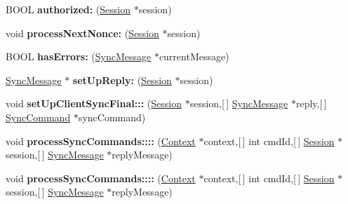 \begin{DoxyCompactItemize}
\item 
\hypertarget{interface_sync_helper_a62a98066f665672a708cd665ad974815}{
\-B\-O\-O\-L {\bfseries authorized\-:} (\hyperlink{interface_session}{\-Session} $\ast$session)}
\label{interface_sync_helper_a62a98066f665672a708cd665ad974815}

\item 
\hypertarget{interface_sync_helper_a077fea806643f0327aea70bb8d94c387}{
void {\bfseries process\-Next\-Nonce\-:} (\hyperlink{interface_session}{\-Session} $\ast$session)}
\label{interface_sync_helper_a077fea806643f0327aea70bb8d94c387}

\item 
\hypertarget{interface_sync_helper_a512e8a3540b1e98b7b90a0064d034ee8}{
\-B\-O\-O\-L {\bfseries has\-Errors\-:} (\hyperlink{interface_sync_message}{\-Sync\-Message} $\ast$current\-Message)}
\label{interface_sync_helper_a512e8a3540b1e98b7b90a0064d034ee8}

\item 
\hypertarget{interface_sync_helper_a21a293ea4849bd1eadd24d45d63a8d99}{
\hyperlink{interface_sync_message}{\-Sync\-Message} $\ast$ {\bfseries set\-Up\-Reply\-:} (\hyperlink{interface_session}{\-Session} $\ast$session)}
\label{interface_sync_helper_a21a293ea4849bd1eadd24d45d63a8d99}

\item 
\hypertarget{interface_sync_helper_a52073dfff575ed4ff2da93d039051125}{
void {\bfseries set\-Up\-Client\-Sync\-Final\-:::} (\hyperlink{interface_session}{\-Session} $\ast$session,\mbox{[}$\,$\mbox{]} \hyperlink{interface_sync_message}{\-Sync\-Message} $\ast$reply,\mbox{[}$\,$\mbox{]} \hyperlink{interface_sync_command}{\-Sync\-Command} $\ast$sync\-Command)}
\label{interface_sync_helper_a52073dfff575ed4ff2da93d039051125}

\item 
\hypertarget{interface_sync_helper_a23c00192de5175e341a6ed6d7186be51}{
void {\bfseries process\-Sync\-Commands\-::::} (\hyperlink{interface_context}{\-Context} $\ast$context,\mbox{[}$\,$\mbox{]} int cmd\-Id,\mbox{[}$\,$\mbox{]} \hyperlink{interface_session}{\-Session} $\ast$session,\mbox{[}$\,$\mbox{]} \hyperlink{interface_sync_message}{\-Sync\-Message} $\ast$reply\-Message)}
\label{interface_sync_helper_a23c00192de5175e341a6ed6d7186be51}

\item 
\hypertarget{interface_sync_helper_a23c00192de5175e341a6ed6d7186be51}{
void {\bfseries process\-Sync\-Commands\-::::} (\hyperlink{interface_context}{\-Context} $\ast$context,\mbox{[}$\,$\mbox{]} int cmd\-Id,\mbox{[}$\,$\mbox{]} \hyperlink{interface_session}{\-Session} $\ast$session,\mbox{[}$\,$\mbox{]} \hyperlink{interface_sync_message}{\-Sync\-Message} $\ast$reply\-Message)}
\label{interface_sync_helper_a23c00192de5175e341a6ed6d7186be51}


\end{DoxyCompactItemize}
